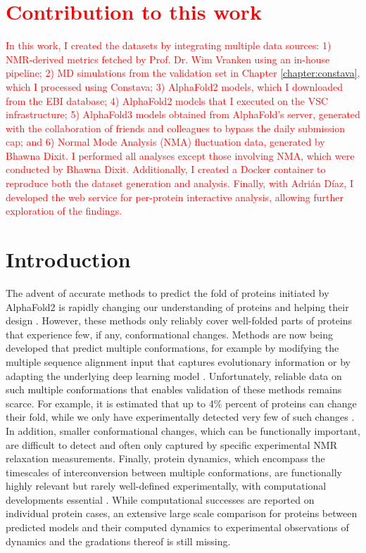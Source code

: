 \section*{\textcolor{red}{Contribution to this work}}
\textcolor{red}{In this work, I created the datasets by integrating multiple data sources: 1) NMR-derived metrics fetched by Prof. Dr. Wim Vranken using an in-house pipeline; 2) MD simulations from the validation set in Chapter \ref{chapter:constava}, which I processed using Constava; 3) AlphaFold2 models, which I downloaded from the EBI database; 4) AlphaFold2 models that I executed on the VSC infrastructure; 5) AlphaFold3 models obtained from AlphaFold's server, generated with the collaboration of friends and colleagues to bypass the daily submission cap; and 6) Normal Mode Analysis (NMA) fluctuation data, generated by Bhawna Dixit. I performed all analyses except those involving NMA, which were conducted by Bhawna Dixit. Additionally, I created a Docker container to reproduce both the dataset generation and analysis. Finally, with Adrián Díaz, I developed the web service for per-protein interactive analysis, allowing further exploration of the findings.}



\newpage

\section{Introduction}

The advent of accurate methods to predict the fold of proteins initiated by AlphaFold2 \cite{jumper_highly_2021} is rapidly changing our understanding of proteins \cite{bordin_alphafold2_2023, durairaj_uncovering_2023} and helping their design \cite{dauparas_robust_2022, watson_novo_2023, sumida_improving_2024}. However, these methods only reliably cover well-folded parts of proteins that experience few, if any, conformational changes. Methods are now being developed that predict multiple conformations, for example by modifying the multiple sequence alignment input that captures evolutionary information \cite{wayment-steele_predicting_2023} or by adapting the underlying deep learning model \cite{heo_multi-state_2022}. Unfortunately, reliable data on such multiple conformations that enables validation of these methods remains scarce. For example, it is estimated that up to 4\% percent of proteins can change their fold, while we only have experimentally detected very few of such changes \cite{porter_extant_2018}. In addition, smaller conformational changes, which can be functionally important, are difficult to detect and often only captured by specific experimental NMR relaxation measurements\cite{kovermann_2016}. Finally, protein dynamics, which encompass the timescales of interconversion between multiple conformations, are functionally highly relevant but rarely well-defined experimentally, with computational developments essential \cite{noe_machine_2020}. While computational successes are reported on individual protein cases, an extensive large scale comparison for proteins between predicted models and their computed dynamics to experimental observations of dynamics and the gradations thereof is still missing.

